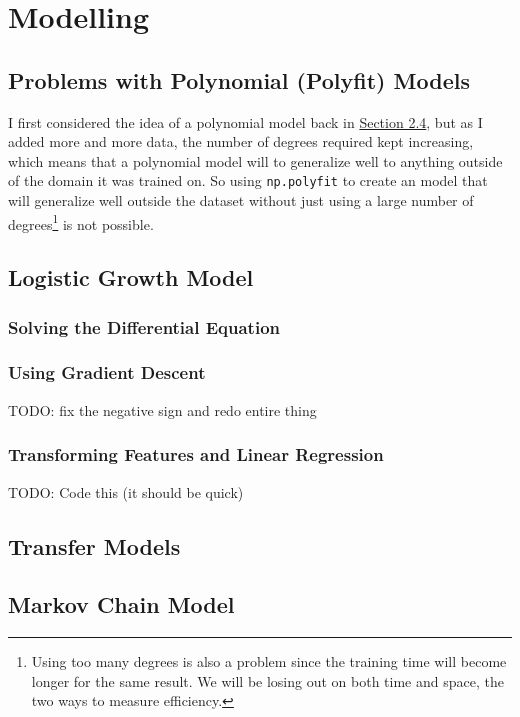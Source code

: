 \documentclass{report}
\begin{document}
    \section{Modelling}
        \subsection{Problems with Polynomial (Polyfit) Models}
        \label{sec:problems}
            I first considered the idea of a polynomial model back in \hyperref[sec:polys]{Section 2.4}, but as I added more and more data, the number of degrees required kept increasing, which means that a polynomial model will to generalize well to anything outside of the domain it was trained on.
            \newline\indent
            So using \lstinline{np.polyfit} to create an model that will generalize well outside the dataset without just using a large number of degrees\footnote{Using too many degrees is also a problem since the training time will become longer for the same result. We will be losing out on both time and space, the two ways to measure efficiency.} is not possible.
        \subsection{Logistic Growth Model}
            \subsubsection{Solving the Differential Equation}
            \subsubsection{Using Gradient Descent}
            TODO: fix the negative sign and redo entire thing
            \subsubsection{Transforming Features and Linear Regression}
            TODO: Code this (it should be quick)
        \subsection{Transfer Models}
        \subsection{Markov Chain Model}
\end{document}
